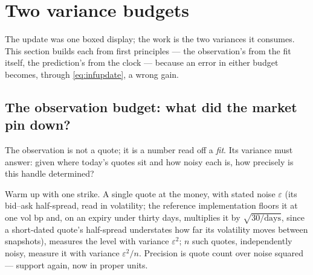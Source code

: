 \section{Two variance budgets}
\label{sec:infbudgets}

The update was one boxed display; the work is the two variances it
consumes.  This section builds each from first principles --- the
observation's from the fit itself, the prediction's from the clock
--- because an error in either budget becomes, through
\cref{eq:infupdate}, a wrong gain.

\subsection{The observation budget: what did the market pin down?}

The observation is not a quote; it is a number read off a
\emph{fit}.  Its variance must answer: given where today's quotes
sit and how noisy each is, how precisely is this handle determined?

Warm up with one strike.  A single quote at the money, with stated
noise $\varepsilon$ (its bid--ask half-spread, read in volatility;
the reference implementation floors it at one vol bp and, on an
expiry under thirty days, multiplies it by $\sqrt{30/\text{days}}$,
since a short-dated quote's half-spread understates how far its
volatility moves between snapshots),
measures the level with variance $\varepsilon^2$; $n$ such quotes,
independently noisy, measure it with variance $\varepsilon^2/n$.
Precision is quote count over noise squared --- support again, now
in proper units.

